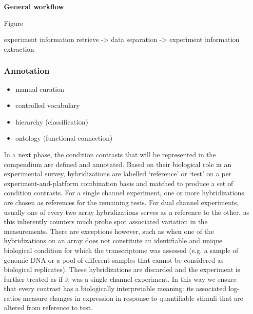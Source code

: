 \textbf{General workflow}

Figure

experiment information retrieve -> data separation -> experiment information
extraction









\subsubsection{Annotation}

\begin{itemize}
\item manual curation
\item controlled vocabulary
\item hierarchy (classification)
\item ontology (functional connection)
\end{itemize}


In a next phase, the condition contrasts that will be represented in the
compendium are defined and annotated.
%
Based on their biological role in an experimental survey, hybridizations are
labelled `reference' or `test' on a per experiment-and-platform combination
basis and matched to produce a set of condition contrasts.
%
For a single channel experiment, one or more hybridizations are chosen as 
references for the remaining tests. 
%
For dual channel experiments, usually one of every two array hybridizations
serves as a reference to the other, as this inherently counters much probe spot
associated variation in the measurements.
%
There are exceptions however, such as when one of the hybridizations on an
array does not constitute an identifiable and unique biological condition for
which the transcriptome was assessed (e.g. a sample of genomic DNA or a pool of
different samples that cannot be considered as biological replicates).
%
These hybridizations are discarded and the experiment is further treated as if
it was a single channel experiment.
%
In this way we ensure that every contrast has a biologically interpretable
meaning: its associated log-ratios measure changes in expression in response to
quantifiable stimuli that are altered from reference to test.



